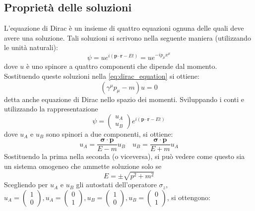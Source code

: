 \documentclass{subnucbo}
\begin{document}
\subsection{Proprietà delle soluzioni}
L'equazione di Dirac è un insieme di quattro equazioni ognuna delle quali deve avere una soluzione.
Tali soluzioni si scrivono nella seguente maniera (utilizzando le unità naturali):
\begin{equation}
        \psi = u e ^ { i ( \mathbf { p } \cdot \mathbf { r } - E t ) } = u e ^ { - i p _ { \mu } x ^ { \mu } }
        \label{eq:dirac_sol}
\end{equation}
dove $u$ è uno spinore a quattro componenti che dipende dal momento. Sostituendo queste soluzioni nella \ref{eq:dirac_equation} si ottiene:
\begin{equation}
        \left( \gamma ^ { \mu } p _ { \mu } - m \right) u = 0
        \label{eq:dirac_eq_momentum}
\end{equation}
detta anche equazione di Dirac nello spazio dei momenti. Sviluppando i conti e utilizzando la rappresentazione
\begin{equation}
        \psi = \left( \begin{array} { l } { u_{A} } \\ { u_{B} } \end{array} \right) e ^ { i ( \mathbf { p } \cdot \mathbf { r } - E t ) }
        \label{eq:dirac_sol_spinors}
\end{equation}
dove $u_{A}$ e $u_{B}$ sono spinori a due componenti, si ottiene:
\begin{equation}
        u _ { A } = \frac { \boldsymbol { \sigma } \cdot \mathbf { p } } { E - m } u _ { B } \quad u _ { B } = \frac { \boldsymbol { \sigma } \cdot \mathbf { p } } { E + m } u _ { A }
\end{equation}
Sostituendo la prima nella seconda (o viceversa), si può vedere come questo sia un sistema omogeneo che ammette soluzione solo se
\begin{equation}
        E = \pm \sqrt { p ^ { 2 } + m ^ { 2 } }
        \label{eq:energy}
\end{equation}
Scegliendo per $u_{A}$ e $u_{B}$ gli autostati dell'operatore $\sigma_{z}$, $u _ { A } = \left( \begin{array} { c } { 1 } \\ { 0 } \end{array} \right) , u _ { A } = \left( \begin{array} { l } { 0 } \\ { 1 } \end{array} \right), u _ { B } = \left( \begin{array} { c } { 1 } \\ { 0 } \end{array} \right) , u _ { B } = \left( \begin{array} { l } { 0 } \\ { 1 } \end{array} \right)$, si ottengono:
\end{document}
